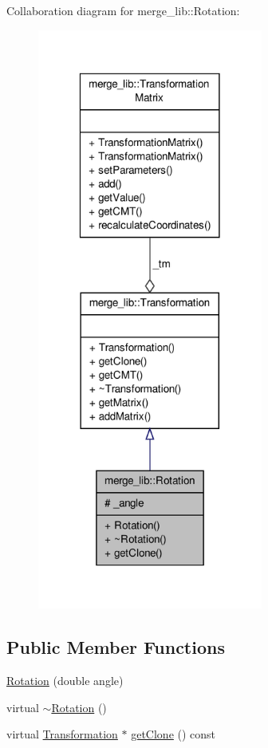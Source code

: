 Collaboration diagram for merge\-\_\-lib\-:\-:Rotation\-:
\nopagebreak
\begin{figure}[H]
\begin{center}
\leavevmode
\includegraphics[width=210pt]{da/d9f/classmerge__lib_1_1_rotation__coll__graph}
\end{center}
\end{figure}
\subsection*{Public Member Functions}
\begin{DoxyCompactItemize}
\item 
\hyperlink{classmerge__lib_1_1_rotation_a3595951335967dcdad7c81ffa201b871}{Rotation} (double angle)
\item 
virtual \hyperlink{classmerge__lib_1_1_rotation_ae3b8b61328e3abf6af2d7e03a02864a2}{$\sim$\-Rotation} ()
\item 
virtual \hyperlink{classmerge__lib_1_1_transformation}{Transformation} $\ast$ \hyperlink{classmerge__lib_1_1_rotation_a6ccd72898a7f4bf6f17a7595df915180}{get\-Clone} () const 
\end{DoxyCompactItemize}
